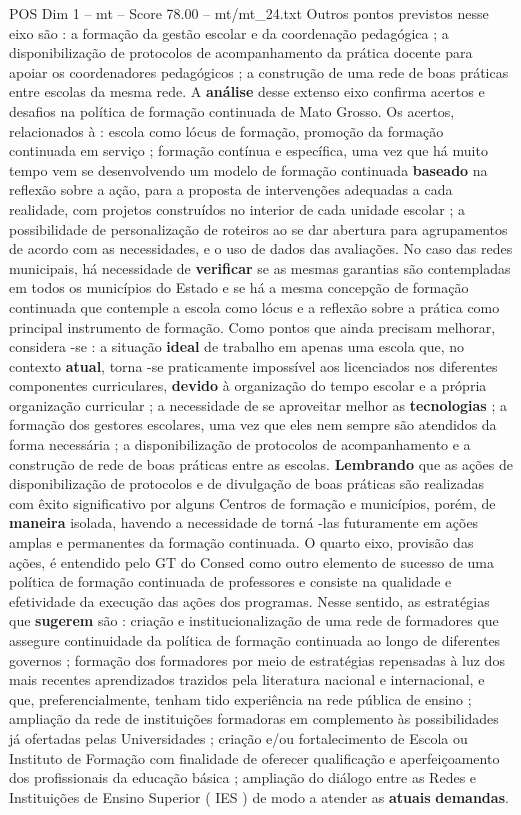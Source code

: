 \begin{textsample}{POS Dim 1 – mt – Score 78.00 – mt/mt\_24.txt}
Outros pontos previstos nesse eixo são : a formação da gestão escolar e da coordenação pedagógica ; a disponibilização de protocolos de acompanhamento da prática docente para apoiar os coordenadores pedagógicos ; a construção de uma rede de boas práticas entre escolas da mesma rede.
A \textbf{análise} desse extenso eixo confirma acertos e desafios na política de formação continuada de Mato Grosso.
Os acertos, relacionados à : escola como lócus de formação, promoção da formação continuada em serviço ; formação contínua e específica, uma vez que há muito tempo vem se desenvolvendo um modelo de formação continuada \textbf{baseado} na reflexão sobre a ação, para a proposta de intervenções adequadas a cada realidade, com projetos construídos no interior de cada unidade escolar ; a possibilidade de personalização de roteiros ao se dar abertura para agrupamentos de acordo com as necessidades, e o uso de dados das avaliações.
No caso das redes municipais, há necessidade de \textbf{verificar} se as mesmas garantias são contempladas em todos os municípios do Estado e se há a mesma concepção de formação continuada que contemple a escola como lócus e a reflexão sobre a prática como principal instrumento de formação.
Como pontos que ainda precisam melhorar, considera -se : a situação \textbf{ideal} de trabalho em apenas uma escola que, no contexto \textbf{atual}, torna -se praticamente impossível aos licenciados nos diferentes componentes curriculares, \textbf{devido} à organização do tempo escolar e a própria organização curricular ; a necessidade de se aproveitar melhor as \textbf{tecnologias} ; a formação dos gestores escolares, uma vez que eles nem sempre são atendidos da forma necessária ; a disponibilização de protocolos de acompanhamento e a construção de rede de boas práticas entre as escolas. \textbf{Lembrando} que as ações de disponibilização de protocolos e de divulgação de boas práticas são realizadas com êxito significativo por alguns Centros de formação e municípios, porém, de \textbf{maneira} isolada, havendo a necessidade de torná -las futuramente em ações amplas e permanentes da formação continuada.
O quarto eixo, provisão das ações, é entendido pelo GT do Consed como outro elemento de sucesso de uma política de formação continuada de professores e consiste na qualidade e efetividade da execução das ações dos programas.
Nesse sentido, as estratégias que \textbf{sugerem} são : criação e institucionalização de uma rede de formadores que assegure continuidade da política de formação continuada ao longo de diferentes governos ; formação dos formadores por meio de estratégias repensadas à luz dos mais recentes aprendizados trazidos pela literatura nacional e internacional, e que, preferencialmente, tenham tido experiência na rede pública de ensino ; ampliação da rede de instituições formadoras em complemento às possibilidades já ofertadas pelas Universidades ; criação e/ou fortalecimento de Escola ou Instituto de Formação com finalidade de oferecer qualificação e aperfeiçoamento dos profissionais da educação básica ; ampliação do diálogo entre as Redes e Instituições de Ensino Superior ( IES ) de modo a atender as \textbf{atuais} \textbf{demandas}.

\end{textsample}
